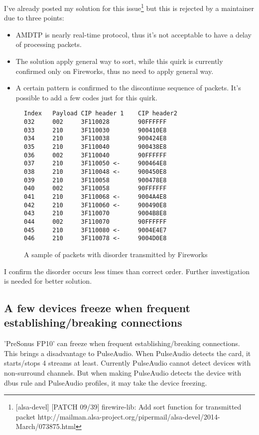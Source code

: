 \documentclass[onecolumn]{jarticle}
\begin{document}
I've already posted my solution for this issue\footnote{[alsa-devel] [PATCH 09/39] firewire-lib: Add sort function for transmitted packet http://mailman.alsa-project.org/pipermail/alsa-devel/2014-March/073875.html} but this is rejected by a maintainer due to three points:
\begin{itemize}
\item AMDTP is nearly real-time protocol, thus it's not acceptable to have a delay of processing packets.
\item The solution apply general way to sort, while this quirk is currently confirmed only on Fireworks, thus no need to apply general way.
\item A certain pattern is confirmed to the discontinue sequence of packets. It's possible to add a few codes just for this quirk.
\end{itemize}

\begin{figure}[htbp]
\small
\begin{verbatim}
Index   Payload CIP header 1    CIP header2
032     002     3F110028        90FFFFFF
033     210     3F110030        900410E8
034     210     3F110038        900424E8
035     210     3F110040        900438E8
036     002     3F110040        90FFFFFF
037     210     3F110050 <-     900464E8
038     210     3F110048 <-     900450E8
039     210     3F110058        900478E8
040     002     3F110058        90FFFFFF
041     210     3F110068 <-     9004A4E8
042     210     3F110060 <-     900490E8
043     210     3F110070        9004B8E8
044     002     3F110070        90FFFFFF
045     210     3F110080 <-     9004E4E7
046     210     3F110078 <-     9004D0E8
\end{verbatim}
\caption{A sample of packets with disorder transmitted by Fireworks}
\label{fireworks-disorder}
\end{figure}

I confirm the disorder occurs less times than correct order. Further investigation is needed for better solution.

\subsection{A few devices freeze when frequent establishing/breaking connections}
'PreSonus FP10' can freeze when frequent establishing/breaking connections. This brings a disadvantage to PulseAudio. When PulseAudio detects the card, it starts/stops 4 streams at least. Currently PulseAudio cannot detect devices with non-surround channels. But when making PulseAudio detects the device with dbus rule and PulseAudio profiles, it may take the device freezing.
\end{document}
